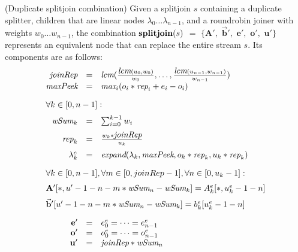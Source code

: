 
\begin{transformation} (Duplicate splitjoin combination)
Given a splitjoin $s$ containing a duplicate splitter, children that
are linear nodes $\lambda_0 \dots \lambda_{n-1}$, and a roundrobin
joiner with weights $w_0 \dots w_{n-1}$, the combination 
$\mbox{\bf splitjoin}(s)$ $=$ $ \{ \mathbf{A}',$ $\vec{\mathbf{b}}',$ $\mathbf{e}',$
$\mathbf{o}',$ $\mathbf{u}'\}$ represents an equivalent node that can
replace the entire stream $s$.  Its components are as follows:
\begin{equation} \nonumber
\begin{array}{rcl}
\mt{joinRep} & = & \mt{lcm}(\frac{\mt{lcm}(u_0,w_0)}{w_0}, \dots, \frac{\mt{lcm}(u_{n-1},w_{n-1})}{w_{n-1}}) \\
\mt{maxPeek} & = & \mt{max}_i (o_i * \mt{rep}_i + e_i - o_i) \\ ~ \vspace{-2pt} \\
\multicolumn{3}{l}{\forall k \in [0, n-1]:} \\ ~ \vspace{-6pt} \\
\mt{wSum}_k & = & \sum_{i=0}^{k-1} w_i \\ ~ \vspace{-6pt} \\
\mt{rep}_k & = & \frac{w_k * \mt{joinRep}}{u_k} \\ ~ \vspace{-6pt} \\
\lambda_k^e & = & \mt{expand}(\lambda_k, \mt{maxPeek}, 
                              o_k * \mt{rep}_k, u_k * \mt{rep}_k) \\ ~ \vspace{-2pt} \\
\multicolumn{3}{l}{\forall k \in [0, n-1], \forall m \in [0, joinRep-1], \forall n \in [0, u_k-1]:} \\ ~ \vspace{-6pt} \\
\multicolumn{3}{l}{\mathbf{A}'[*, u'-1-n - m * \mt{wSum}_{n}-\mt{wSum}_{k}] = 
  A_{k}^e [*,u_k^e-1-n]} \\ ~ \vspace{-6pt} \\
\multicolumn{3}{l}{\vec{\mathbf{b}}'[u'-1-n - m * \mt{wSum}_{n}-\mt{wSum}_{k}] = 
  b_{k}^e [u_k^e-1-n]} \\ ~ \vspace{-2pt} \\
\mathbf{e}' & = & e_0^e = \dots = e_{n-1}^e \\
\mathbf{o}' & = & o_0^e = \dots = o_{n-1}^e \\
\mathbf{u}' & = & \mt{joinRep} * \mt{wSum}_n \\
\end{array}
\end{equation}
\end{transformation}

